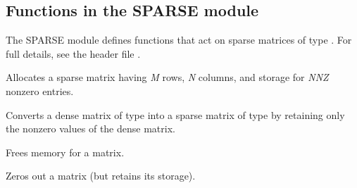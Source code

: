 \documentclass[letterpaper,10pt,english]{sphinxmanual}
\begin{document}
\subsection{Functions in the SPARSE module}
\label{linear_solvers/SLS:functions-in-the-sparse-module}
The SPARSE module defines functions that act on sparse matrices of
type {\hyperref[linear_solvers/SLS:c.SlsMat]{\emph{}}}.  For full details, see the header file
.

\begin{fulllineitems}
\label{linear_solvers/SLS:c.NewSparseMat}
Allocates a {\hyperref[linear_solvers/SLS:c.SlsMat]{\emph{}}} sparse matrix having \emph{M} rows, \emph{N}
columns, and storage for \emph{NNZ} nonzero entries.

\end{fulllineitems}


\begin{fulllineitems}
\label{linear_solvers/SLS:c.SlsConvertDls}
Converts a dense matrix of type {\hyperref[linear_solvers/DLS:c.DlsMat]{\emph{}}} into a sparse
matrix of type {\hyperref[linear_solvers/SLS:c.SlsMat]{\emph{}}} by retaining only the nonzero
values of the dense matrix.

\end{fulllineitems}


\begin{fulllineitems}
\label{linear_solvers/SLS:c.DestroySparseMat}
Frees memory for a {\hyperref[linear_solvers/SLS:c.SlsMat]{\emph{}}} matrix.

\end{fulllineitems}


\begin{fulllineitems}
\label{linear_solvers/SLS:c.SlsSetToZero}
Zeros out a {\hyperref[linear_solvers/SLS:c.SlsMat]{\emph{}}} matrix (but retains its storage).

\end{fulllineitems}
\end{document}
